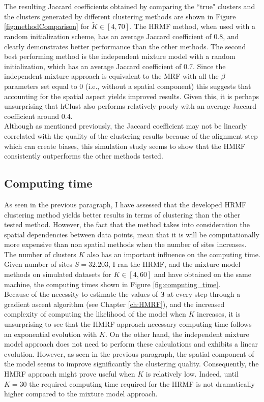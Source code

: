 	The resulting Jaccard coefficients obtained by comparing the ``true" clusters and the clusters generated by different clustering methods are shown in Figure \ref{fig:methodComparison} for $\tilde{K} \in [4,70]$. The HRMF method, when used with a random initialization scheme, has an average Jaccard coefficient of $0.8$, and clearly demonstrates better performance than the other methods. The second best performing method is the independent mixture model with a random initialization, which has an average Jaccard coefficient of $0.7$. Since the independent mixture approach is equivalent to the MRF with all the $\beta$ parameters set equal to 0 (i.e., without a spatial component) this suggests that accounting for the spatial aspect yields improved results.  Given this, it is perhaps unsurprising that hClust also performs relatively poorly with an average Jaccard coefficient around $0.4$.\\
	
	Although as mentioned previously, the Jaccard coefficient may not be linearly correlated with the quality of the clustering results because of the alignment step which can create biases, this simulation study seems to show that the HMRF consistently outperforms the other methods tested.
	
	
	\subsection{Computing time}
	As seen in the previous paragraph, I have assessed that the developed HRMF clustering method yields better results in terms of clustering than the other tested method. However, the fact that the method takes into consideration the spatial dependencies between data points, mean that it is will be computationally more expensive than non spatial methods when the number of sites increases.\\
	
	The number of clusters $K$ also has an important influence on the computing time. Given number of sites $S=32.203$, I ran the HRMF, and the mixture model methods on simulated datasets for $K \in [4,60]$ and have obtained on the same machine, the computing times shown in Figure \ref{fig:computing_time}.\\
	
	Because of the necessity to estimate the values of $\boldsymbol{\beta}$ at every step through a gradient ascent algorithm (see Chapter \ref{ch:HMRF}), and the increased complexity of computing the likelihood of the model when $K$ increases, it is unsurprising to see that the HMRF approach necessary computing time follows an exponential evolution with $K$. On the other hand, the independent mixture model approach does not need to perform these calculations and exhibits a linear evolution. However, as seen in the previous paragraph, the spatial component of the model seems to improve significantly the clustering quality. Consequently, the HMRF approach might prove useful when $K$ is relatively low. Indeed, until $K=30$ the required computing time required for the HRMF is not dramatically higher compared to the mixture model approach.\\
	
